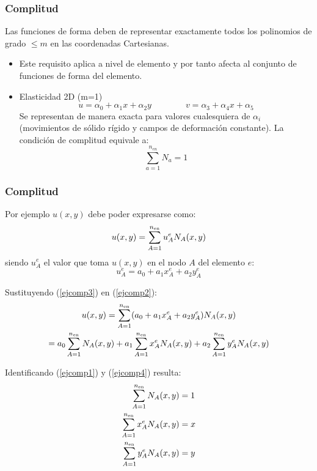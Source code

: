 \documentclass{beamer}
\begin{document}
\begin{frame}
\frametitle{Complitud}
Las funciones de forma deben de representar exactamente todos los polinomios
de grado $\leq m$ en las coordenadas Cartesianas.
\begin{itemize}
\item Este requisito aplica a nivel de elemento y por tanto afecta al conjunto
de funciones de forma del elemento.
\item Elasticidad 2D (m=1)
\begin{equation}
u=\alpha_0 + \alpha_1 x + \alpha_2 y \qquad \qquad
v=\alpha_3 + \alpha_4 x + \alpha_5 \label{ejcomp1}
\end{equation}
Se representan de manera exacta para valores cualesquiera de $\alpha_i$ (movimientos de sólido rígido y campos de deformación constante). La condición de complitud equivale a:
$$
\sum_{a=1}^{n_{en}} N_a = 1
$$
\end{itemize}
\end{frame}
\begin{frame}
	\frametitle{Complitud}
Por ejemplo $u(x,y)$ debe poder expresarse como:
\begin{equation}
	u(x,y)=\sum_{A=1}^{n_{\rm en}} u^e_A N_A(x,y) \label{ejcomp2}
\end{equation}
siendo $u^e_A$ el valor que toma $u(x,y)$ en el nodo $A$ del elemento $e$:
\begin{equation}
	u^e_A=a_0+a_1 x^e_A + a_2 y^e_A \label{ejcomp3}
\end{equation}

Sustituyendo (\ref{ejcomp3}) en (\ref{ejcomp2}):
\begin{multline}
	u(x,y)=\sum_{A=1}^{n_{\rm en}} (a_0+a_1 x^e_A + a_2 y^e_A) N_A(x,y) \\
	=a_0 \sum_{A=1}^{n_{\rm en}} N_A(x,y)     +
	a_1 \sum_{A=1}^{n_{\rm en}} x^e_A N_A(x,y) +
	a_2 \sum_{A=1}^{n_{\rm en}} y^e_A N_A(x,y)     \label{ejcomp4}
\end{multline}
\end{frame}
\begin{frame}
Identificando (\ref{ejcomp1}) y (\ref{ejcomp4}) resulta:
\begin{align}
	\sum_{A=1}^{n_{\rm en}} N_A(x,y) &= 1 \label{ejcomp5}  \\
	\sum_{A=1}^{n_{\rm en}} x^e_A N_A(x,y) &= x \label{ejcomp6}  \\
	\sum_{A=1}^{n_{\rm en}} y^e_A N_A(x,y) &= y \label{ejcomp7}
\end{align}
\end{frame}
\end{document}
